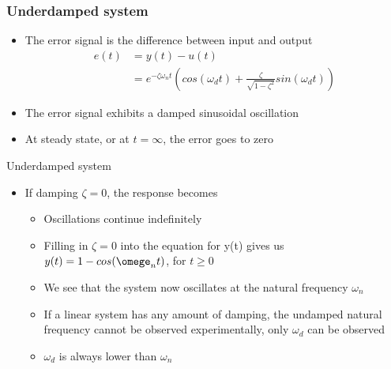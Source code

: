 \begin{frame}
\frametitle{Underdamped system}
\begin{itemize}
\item The error signal is the difference between input and output
\begin{align*}
e(t)&= y(t) -u(t)
\\&= e^{-\zeta\omega_n t}(cos(\omega_d t)+\frac{\zeta}{\sqrt{1 - \zeta^2}}sin(\omega_d t))
\end{align*}
\item The error signal exhibits a damped sinusoidal oscillation
\vspace{0.8cm}
\item At steady state, or at $t=\infty$, the error goes to zero
\end{itemize}
\end{frame}

\begin{frame}{Underdamped system}
\begin{itemize}
\vspace{-0.5cm}
\item If damping $\zeta=0$, the response becomes 
\begin{itemize}
\vspace{0.25cm}
\item Oscillations continue indefinitely
\vspace{0.5cm}
\item Filling in $\zeta=0$ into the equation for y(t) gives us
\\ $y(t) = 1 -cos(\omege_n t)$, for $t\ge 0$
\vspace{0.5cm}
\item We see that the system now oscillates at the natural frequency $\omega_n$
\vspace{0.5cm}
\item If a linear system has any amount of damping, the undamped natural frequency cannot be observed experimentally, only $\omega_d$ can be observed
\vspace{0.5cm}
\item $\omega_d$ is always lower than $\omega_n$
\end{itemize} 
\end{itemize}
\end{frame}

